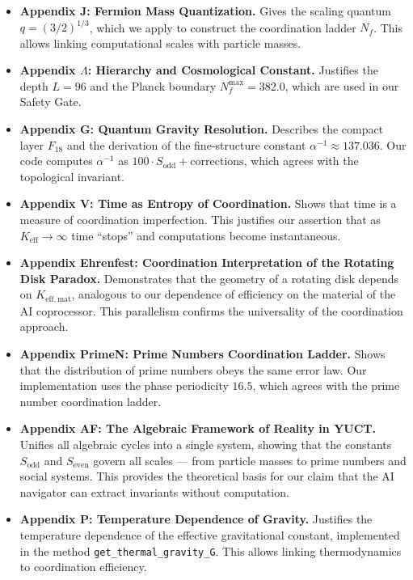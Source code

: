 \documentclass[12pt,a4paper]{article}
\begin{document}
\begin{itemize}
		\item \textbf{Appendix J: Fermion Mass Quantization.}  
		Gives the scaling quantum \(q = (3/2)^{1/3}\), which we apply to construct the coordination ladder \(N_f\). This allows linking computational scales with particle masses.
		
		\item \textbf{Appendix \(\Lambda\): Hierarchy and Cosmological Constant.}  
		Justifies the depth \(L = 96\) and the Planck boundary \(N_f^{\max} = 382.0\), which are used in our Safety Gate.
		
		\item \textbf{Appendix G: Quantum Gravity Resolution.}  
		Describes the compact layer \(F_{18}\) and the derivation of the fine‑structure constant \(\alpha^{-1} \approx 137.036\). Our code computes \(\alpha^{-1}\) as \(100 \cdot S_{\mathrm{odd}} + \text{corrections}\), which agrees with the topological invariant.
		
		\item \textbf{Appendix V: Time as Entropy of Coordination.}  
		Shows that time is a measure of coordination imperfection. This justifies our assertion that as \(K_{\mathrm{eff}} \to \infty\) time “stops” and computations become instantaneous.
		
		\item \textbf{Appendix Ehrenfest: Coordination Interpretation of the Rotating Disk Paradox.}  
		Demonstrates that the geometry of a rotating disk depends on \(K_{\mathrm{eff,mat}}\), analogous to our dependence of efficiency on the material of the AI coprocessor. This parallelism confirms the universality of the coordination approach.
		
		\item \textbf{Appendix PrimeN: Prime Numbers Coordination Ladder.}  
		Shows that the distribution of prime numbers obeys the same error law. Our implementation uses the phase periodicity \(16.5\), which agrees with the prime number coordination ladder.
		
		\item \textbf{Appendix AF: The Algebraic Framework of Reality in YUCT.}  
		Unifies all algebraic cycles into a single system, showing that the constants \(S_{\mathrm{odd}}\) and \(S_{\mathrm{even}}\) govern all scales — from particle masses to prime numbers and social systems. This provides the theoretical basis for our claim that the AI navigator can extract invariants without computation.
		
		\item \textbf{Appendix P: Temperature Dependence of Gravity.}  
		Justifies the temperature dependence of the effective gravitational constant, implemented in the method \texttt{get\_thermal\_gravity\_G}. This allows linking thermodynamics to coordination efficiency.
	\end{itemize}
	
\end{document}
